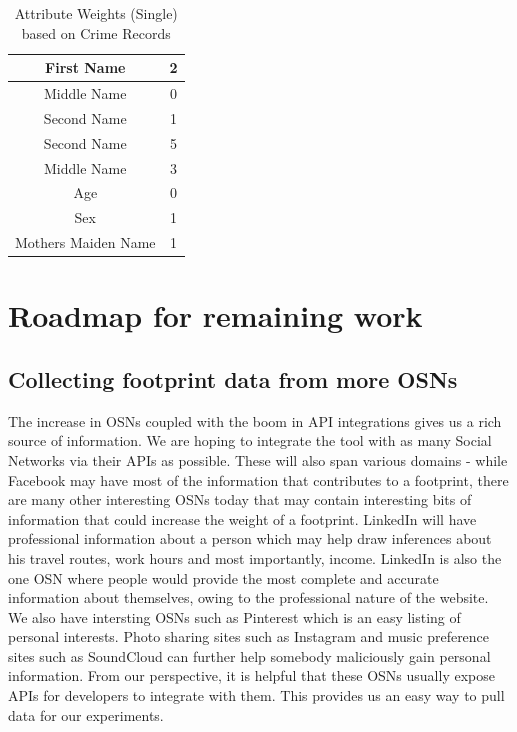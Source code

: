 \documentclass[12pt,conference]{IEEEtran}
\begin{document}
\begin{table}[!t]
\renewcommand{\arraystretch}{3.0}
\caption{Attribute Weights (Single) based on Crime Records}
\label{attribute_table}
\centering
\begin{tabular}{|c||c|}
\hline
\large{First Name} & \large{2}\\
\hline
\large{Middle Name} & \large{0}\\
\hline
\large{Second Name} & \large{1}\\
\large{Second Name} & \large{5}\\
\hline
\large{Middle Name} & \large{3}\\
\hline
\large{Age} & \large{0}\\
\hline
\large{Sex} & \large{1}\\
\hline
\large{Mothers Maiden Name} & \large{1}\\
\hline

\end{tabular}
\end{table}

\section{Roadmap for remaining work}
\subsection{Collecting footprint data from more OSNs}
The increase in OSNs coupled with the boom in API integrations gives us a rich source of information. We are hoping to integrate the tool with as many Social Networks via their APIs as possible. These will also span various domains - while Facebook may have most of the information that contributes to a footprint, there are many other interesting OSNs today that may contain interesting bits of information that could increase the weight of a footprint. LinkedIn will have professional information about a person which may help draw inferences about his travel routes, work hours and most importantly, income. LinkedIn is also the one OSN where people would provide the most complete and accurate information about themselves, owing to the professional nature of the website. We also have intersting OSNs such as Pinterest which is an easy listing of personal interests. Photo sharing sites such as Instagram and music preference sites such as SoundCloud can further help somebody maliciously gain personal information. From our perspective, it is helpful that these OSNs usually expose APIs for developers to integrate with them. This provides us an easy way to pull data for our experiments.
\end{document}
